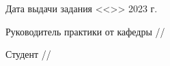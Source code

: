 \vfill

\noindent Дата выдачи задания <<>> 2023 г.

\vspace{1cm}



\noindent Руководитель практики от кафедры \hfill \ulinetext[2cm]{}{}//

\vspace{0.3cm}

\noindent Студент \hfill \ulinetext[2cm]{}{}//

\vfill

\thispagestyle{empty} 